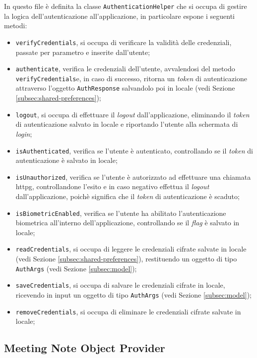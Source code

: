 In questo file è definita la classe \lstinline{AuthenticationHelper} che si occupa di gestire la logica dell'autenticazione all'applicazione, in particolare espone i seguenti metodi:
\begin{itemize}
    \item \lstinline{verifyCredentials}, si occupa di verificare la validità delle credenziali, passate per parametro e inserite dall'utente;
    \item \lstinline{authenticate}, verifica le credenziali dell'utente, avvalendosi del metodo \lstinline{verifyCredentials}e, in caso di successo, ritorna un \emph{token} di autenticazione attraverso l'oggetto \lstinline{AuthResponse} salvandolo poi in locale (vedi Sezione \ref{subsec:shared-preferences});
    \item \lstinline{logout}, si occupa di effettuare il \emph{logout} dall'applicazione, eliminando il \emph{token} di autenticazione salvato in locale e riportando l'utente alla schermata di \emph{login};
    \item \lstinline{isAuthenticated}, verifica se l'utente è autenticato, controllando se il \emph{token} di autenticazione è salvato in locale;
    \item \lstinline{isUnauthorized}, verifica se l'utente è autorizzato ad effettuare una chiamata \gls{httpg}\glsoccur, controllandone l'esito e in caso negativo effettua il \emph{logout} dall'applicazione, poichè significa che il \emph{token} di autenticazione è scaduto;
    \item \lstinline{isBiometricEnabled}, verifica se l'utente ha abilitato l'autenticazione biometrica all'interno dell'applicazione, controllando se il \emph{flag} è salvato in locale;
    \item \lstinline{readCredentials}, si occupa di leggere le credenziali cifrate salvate in locale (vedi Sezione \ref{subsec:shared-preferences}), restituendo un oggetto di tipo \lstinline{AuthArgs} (vedi Sezione \ref{subsec:model});
    \item \lstinline{saveCredentials}, si occupa di salvare le credenziali cifrate in locale, ricevendo in input un oggetto di tipo \lstinline{AuthArgs} (vedi Sezione \ref{subsec:model});
    \item \lstinline{removeCredentials}, si occupa di eliminare le credenziali cifrate salvate in locale;
\end{itemize}

\subsection{Meeting Note Object Provider}
\label{subsec:meeting-note-object-provider}

